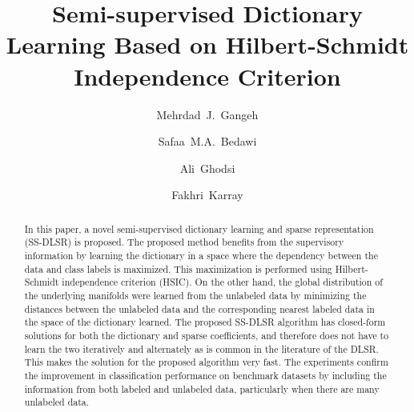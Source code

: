 \documentclass{llncs}
\begin{document}
%
%
\title{Semi-supervised Dictionary Learning Based on Hilbert-Schmidt Independence Criterion}
%
%
\author{Mehrdad~J.~Gangeh \and Safaa~M.A.~Bedawi \and Ali~Ghodsi
\and Fakhri~Karray}
%
%
%


\maketitle              %

\begin{abstract}
In this paper, a novel semi-supervised dictionary learning and sparse representation (SS-DLSR) is proposed. The proposed method benefits from the supervisory information by learning the dictionary in a space where the dependency between the data and class labels is maximized. This maximization is performed using Hilbert-Schmidt independence criterion (HSIC). On the other hand, the global distribution of the underlying manifolds were learned from the unlabeled data by minimizing the distances between the unlabeled data and the corresponding nearest labeled data in the space of the dictionary learned. The proposed SS-DLSR algorithm has closed-form solutions for both the dictionary and sparse coefficients, and therefore does not have to learn the two  iteratively and alternately as is common in the literature of the DLSR. This makes the solution for the proposed algorithm very fast. The experiments confirm the improvement in classification performance on benchmark datasets by including the information from both labeled and unlabeled data, particularly when there are many unlabeled data.
\end{abstract}
%
\end{document}

